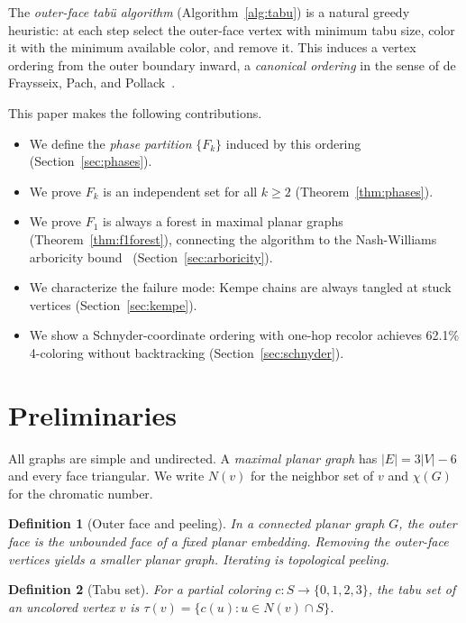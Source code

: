 \documentclass[11pt,twocolumn]{article}
\newtheorem{definition}{Definition}[section]
\begin{document}
The \emph{outer-face tab\"{u} algorithm} (Algorithm~\ref{alg:tabu}) is a
natural greedy heuristic: at each step select the outer-face vertex with minimum
tabu size, color it with the minimum available color, and remove it. This
induces a vertex ordering from the outer boundary inward, a \emph{canonical
ordering} in the sense of de Fraysseix, Pach, and Pollack~\cite{defraysseix1990}.

This paper makes the following contributions.
\begin{itemize}[noitemsep]
  \item We define the \emph{phase partition} $\{F_k\}$ induced by this ordering
        (Section~\ref{sec:phases}).
  \item We prove $F_k$ is an independent set for all $k\geq 2$
        (Theorem~\ref{thm:phases}).
  \item We prove $F_1$ is always a forest in maximal planar graphs
        (Theorem~\ref{thm:f1forest}), connecting the algorithm to the
        Nash-Williams arboricity bound~\cite{nashwilliams1961}
        (Section~\ref{sec:arboricity}).
  \item We characterize the failure mode: Kempe chains are always tangled at
        stuck vertices (Section~\ref{sec:kempe}).
  \item We show a Schnyder-coordinate ordering with one-hop recolor achieves
        62.1\% 4-coloring without backtracking (Section~\ref{sec:schnyder}).
\end{itemize}

\section{Preliminaries}
\label{sec:prelim}

All graphs are simple and undirected. A \emph{maximal planar graph} has
$|E|=3|V|-6$ and every face triangular. We write $N(v)$ for the neighbor set of
$v$ and $\chi(G)$ for the chromatic number.

\begin{definition}[Outer face and peeling]
In a connected planar graph $G$, the \emph{outer face} is the unbounded face of
a fixed planar embedding. Removing the outer-face vertices yields a smaller
planar graph. Iterating is \emph{topological peeling}.
\end{definition}

\begin{definition}[Tabu set]
For a partial coloring $c:S\to\{0,1,2,3\}$, the \emph{tabu set} of an
uncolored vertex $v$ is $\tau(v)=\{c(u):u\in N(v)\cap S\}$.
\end{definition}
\end{document}
